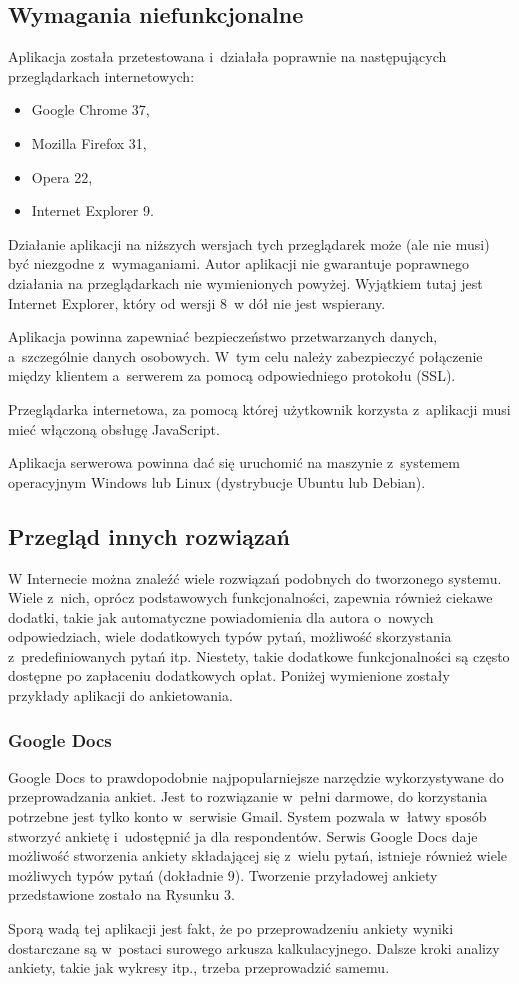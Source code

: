 \documentclass[12pt,a4paper,notitlepage]{article}
\begin{document}
\subsection{Wymagania niefunkcjonalne}
Aplikacja została przetestowana i~działała poprawnie na następujących przeglądarkach internetowych:
\begin{itemize}
\item Google Chrome 37,
\item Mozilla Firefox 31,
\item Opera 22,
\item Internet Explorer 9.
\end{itemize}
Działanie aplikacji na niższych wersjach tych przeglądarek może (ale nie musi) być niezgodne z~wymaganiami. Autor aplikacji nie gwarantuje poprawnego działania na przeglądarkach nie wymienionych powyżej. Wyjątkiem tutaj jest Internet Explorer, który od wersji 8~w dół nie jest wspierany.
\par Aplikacja powinna zapewniać bezpieczeństwo przetwarzanych danych, a~szczególnie danych osobowych. W~tym celu należy zabezpieczyć połączenie między klientem a~serwerem za pomocą odpowiedniego protokołu (SSL).
\par Przeglądarka internetowa, za pomocą której użytkownik korzysta z~aplikacji musi mieć włączoną obsługę JavaScript.
\par Aplikacja serwerowa powinna dać się uruchomić na maszynie z~systemem operacyjnym Windows lub Linux (dystrybucje Ubuntu lub Debian).

\subsection{Przegląd innych rozwiązań}
W Internecie można znaleźć wiele rozwiązań podobnych do tworzonego systemu. Wiele z~nich, oprócz podstawowych funkcjonalności, zapewnia również ciekawe dodatki, takie jak automatyczne powiadomienia dla autora o~nowych odpowiedziach, wiele dodatkowych typów pytań, możliwość skorzystania z~predefiniowanych pytań itp. Niestety, takie dodatkowe funkcjonalności są często dostępne po zapłaceniu dodatkowych opłat. Poniżej wymienione zostały przykłady aplikacji do ankietowania.

\subsubsection{Google Docs}
Google Docs to prawdopodobnie najpopularniejsze narzędzie wykorzystywane do przeprowadzania ankiet. Jest to rozwiązanie w~pełni darmowe, do korzystania potrzebne jest tylko konto w~serwisie Gmail. System pozwala w~łatwy sposób stworzyć ankietę i~udostępnić ja dla respondentów. Serwis Google Docs daje możliwość stworzenia ankiety składającej się z~wielu pytań, istnieje również wiele możliwych typów pytań (dokładnie 9). Tworzenie przyładowej ankiety przedstawione zostało na Rysunku 3.
\par Sporą wadą tej aplikacji jest fakt, że po przeprowadzeniu ankiety wyniki dostarczane są w~postaci surowego arkusza kalkulacyjnego. Dalsze kroki analizy ankiety, takie jak wykresy itp., trzeba przeprowadzić samemu.
\end{document}
